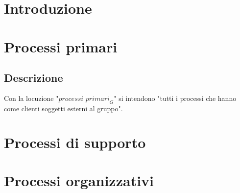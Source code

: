 \documentclass[12pt, oneside]{article}
\begin{document}
\tableofcontents
\newpage
\section{Introduzione}

\newpage

\section{Processi primari}
\subsection{Descrizione}
Con la locuzione "$\textit{processi primari}_G$" si intendono "tutti i processi che hanno come clienti soggetti esterni al gruppo". \\

\newpage

\section{Processi di supporto}


\newpage
\section{Processi organizzativi}

\end{document}

